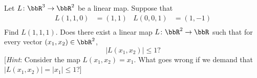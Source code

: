 \begin{questions}
  \question Let $L\colon\bbR^3\to\bbR^2$ be a linear map. Suppose that
  \begin{align*}
    L(1,1,0)&=(1,1)&L(0,0,1)&=(1,-1)\\
  \end{align*}
  Find $L(1,1,1)$.
  \question[4] Does there exist a linear map $L\colon\bbR^2\to\bbR$ such that
  for every vector $(x_1,x_2)\in\bbR^2$,
  \[
    |L(x_1,x_2)|\leq 1?
  \]
  [\emph{Hint}: Consider the map $L(x_1,x_2)=x_1$. What goes wrong if we
  demand that $|L(x_1,x_2)|=|x_1|\leq 1$?]
\end{questions}


